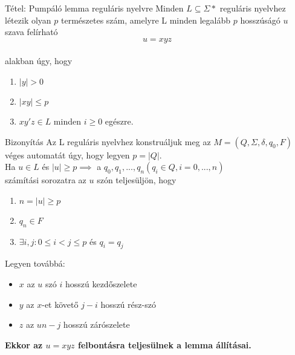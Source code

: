 \documentclass{beamer}
\begin{document}
\begin{frame}
\begin{block}{Tétel: Pumpáló lemma reguláris nyelvre}
Minden $L \subseteq {\Sigma}*$ reguláris nyelvhez létezik olyan $p$ természetes szám, amelyre L minden legalább $p$ hosszúságó $u$ szava felírható $$u = xyz$$\\
alakban úgy, hogy\\
\begin{enumerate}
\item $|y| > 0$
\item $|xy| \leq p$
\item $xy'z \in L$ minden $i \geq 0$ egészre.
\end{enumerate}

\end{block}

\begin{block}{Bizonyítás}
Az L reguláris nyelvhez konstruáljuk meg az $M = (Q, {\Sigma}, {\delta}, q_0, F)$ véges automatát úgy, hogy legyen $p = |Q|$.\\
Ha $u \in L$ és $|u| \geq p \implies$ a $q_0, q_1, ...,q_n (q_i \in Q, i = 0, ..., n)$\\
számítási sorozatra az $u$ szón teljesüljön, hogy\\
\begin{enumerate}
\item $n = |u| \geq p$
\item $q_n \in F$
\item ${\exists}i, j : 0 \leq i < j \leq p$ és $q_i = q_j$
\end{enumerate}
\bigskip
Legyen továbbá:
\begin{itemize}
\item $x$ az $u$ szó $i$ hosszú kezdőszelete
\item $y$ az $x$-et követő $j - i$ hosszú rész-szó
\item $z$ az $u n - j$ hosszú zárószelete 
\end{itemize}
\bigskip
\textbf{Ekkor az $u = xyz$ felbontásra teljesülnek a lemma állításai.}
\end{block}

\end{frame}
\end{document}
